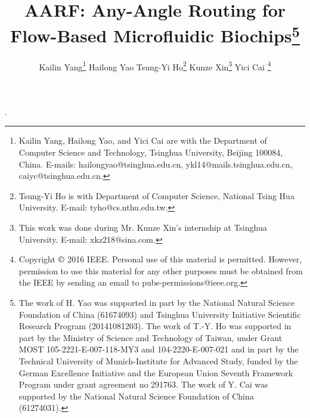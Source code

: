 \documentclass[journal]{IEEEtran}
\begin{document}


\title{AARF: Any-Angle Routing for Flow-Based Microfluidic Biochips\thanks{The work of H. Yao was supported in part by the National Natural Science Foundation of China (61674093) and Tsinghua University Initiative Scientific Research Program (20141081203).
The work of T.-Y. Ho was supported in part by the Ministry of Science and Technology of Taiwan, under Grant MOST 105-2221-E-007-118-MY3 and 104-2220-E-007-021 and in part by the Technical University of Munich-Institute for Advanced Study, funded by the German Excellence Initiative and the European Union Seventh Framework Program under grant agreement no 291763.
The work of Y. Cai was supported by the National Natural Science Foundation of China (61274031).}
}

\author{
\qquad Kailin Yang\thanks{Kailin Yang, Hailong Yao, and Yici Cai are with the Department of Computer Science and Technology, Tsinghua University, Beijing 100084, China. E-mails: hailongyao@tsinghua.edu.cn, ykl14@mails.tsinghua.edu.cn, caiyc@tsinghua.edu.cn.}
\qquad Hailong Yao
\qquad Tsung-Yi Ho\thanks{Tsung-Yi Ho is with Department of Computer Science, National Tsing Hua University. E-mail: tyho@cs.nthu.edu.tw.}
\qquad Kunze Xin\thanks{This work was done during Mr. Kunze Xin's internship at Tsinghua University. E-mail: xkz218@sina.com.}
\qquad Yici Cai
\thanks{Copyright $\copyright$ 2016 IEEE. Personal use of this material is permitted.
However, permission to use this material for any other purposes must be obtained from the IEEE by sending an
email to pubs-permissions@ieee.org.}
}

.
\end{document}
